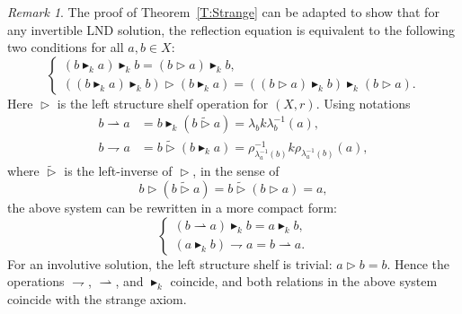 \documentclass{amsart}
\newcommand\lop{\mathrel{\triangleright}}
\newcommand\wlop{\mathrel{\widetilde{\triangleright}}}
\newcommand\klop{\mathrel{\blacktriangleright_k}}
\theoremstyle{plain}
\theoremstyle{definition}
\theoremstyle{remark}
\newtheorem{rem}[thm]{Remark}
\begin{document}
\begin{rem}\label{R:VeryStrange}
The proof of Theorem~\ref{T:Strange} can be adapted to show that for any invertible LND solution, the reflection equation is equivalent to the following two conditions for all $a,b \in X$:
\[\begin{cases} (b \klop a) \klop b = (b \lop a) \klop b,\\
((b \klop a) \klop b) \lop  (b \klop a)= ((b \lop a) \klop b) \klop (b \lop a).
\end{cases}\]
Here $\lop$ is the left structure shelf operation for $(X,r)$.
Using notations
\begin{align*}
b \rightharpoonup a &= b \klop (b \wlop a) = \lambda_b k \lambda^{-1}_b (a), \\
 b \rightharpoondown a &= b \wlop (b \klop a) = \rho^{-1}_{\lambda_a^{-1}(b)} k\rho_{\lambda_a^{-1}(b)}(a),
\end{align*}
where $\wlop$ is the left-inverse of $\lop$, in the sense of
\[b \lop (b \wlop a) = b \wlop (b \lop a)=a,\]
the above system can be rewritten in a more compact form:
\[\begin{cases} (b \rightharpoonup a) \klop b = a \klop b,\\
(a \klop b) \rightharpoondown a = b \rightharpoonup a.
\end{cases}\]
For an involutive solution, the left structure shelf is trivial: $a \lop b = b$. Hence the operations $\rightharpoondown$, $\rightharpoonup$, and $\klop$ coincide, and both relations in the above system coincide with the strange axiom.
\end{rem}





\end{document}
